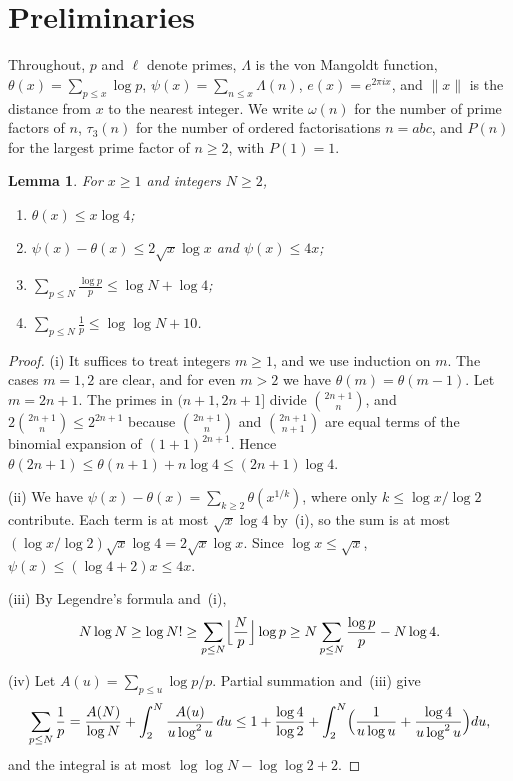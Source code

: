 \documentclass[12pt]{amsart}
\numberwithin{equation}{section}
\newtheorem{lemma}[theorem]{Lemma}
\theoremstyle{definition}
\begin{document}
\section{Preliminaries}\label{sec:prelim}

Throughout, $p$ and $\ell$ denote primes, $\Lambda$ is the von Mangoldt function,
$\theta(x)=\sum_{p\le x}\log p$, $\psi(x)=\sum_{n\le x}\Lambda(n)$, $e(x)=e^{2\pi ix}$, and
$\|x\|$ is the distance from $x$ to the nearest integer. We write $\omega(n)$ for the number of
prime factors of $n$, $\tau_3(n)$ for the number of ordered factorisations $n=abc$, and $P(n)$
for the largest prime factor of $n\ge2$, with $P(1)=1$.

\begin{lemma}\label{lem:chebyshev}
For $x\ge1$ and integers $N\ge2$,
\begin{enumerate}
\item[(i)] $\theta(x)\le x\log4$;
\item[(ii)] $\psi(x)-\theta(x)\le2\sqrt x\log x$ and $\psi(x)\le4x$;
\item[(iii)] $\sum_{p\le N}\frac{\log p}p\le\log N+\log4$;
\item[(iv)] $\sum_{p\le N}\frac1p\le\log\log N+10$.
\end{enumerate}
\end{lemma}

\begin{proof}
(i) It suffices to treat integers $m\ge1$, and we use induction on $m$. The cases $m=1,2$ are
clear, and for even $m>2$ we have $\theta(m)=\theta(m-1)$. Let $m=2n+1$. The primes in
$(n+1,2n+1]$ divide $\binom{2n+1}n$, and $2\binom{2n+1}n\le2^{2n+1}$ because $\binom{2n+1}n$ and
$\binom{2n+1}{n+1}$ are equal terms of the binomial expansion of $(1+1)^{2n+1}$. Hence
$\theta(2n+1)\le\theta(n+1)+n\log4\le(2n+1)\log4$.

(ii) We have $\psi(x)-\theta(x)=\sum_{k\ge2}\theta(x^{1/k})$, where only $k\le\log x/\log2$
contribute. Each term is at most $\sqrt x\log4$ by~(i), so the sum is at most
$(\log x/\log2)\sqrt x\log4=2\sqrt x\log x$. Since $\log x\le\sqrt x$, $\psi(x)\le(\log4+2)x\le4x$.

(iii) By Legendre's formula and~(i),
\[
  N\log N\ge\log N!\ge\sum_{p\le N}\Bigl\lfloor\frac Np\Bigr\rfloor\log p
  \ge N\sum_{p\le N}\frac{\log p}p-N\log4.
\]

(iv) Let $A(u)=\sum_{p\le u}\log p/p$. Partial summation and~(iii) give
\[
  \sum_{p\le N}\frac1p=\frac{A(N)}{\log N}+\int_2^N\frac{A(u)}{u\log^2u}\,du
  \le1+\frac{\log4}{\log2}+\int_2^N\Bigl(\frac1{u\log u}+\frac{\log4}{u\log^2u}\Bigr)du,
\]
and the integral is at most $\log\log N-\log\log2+2$.
\end{proof}
\end{document}
